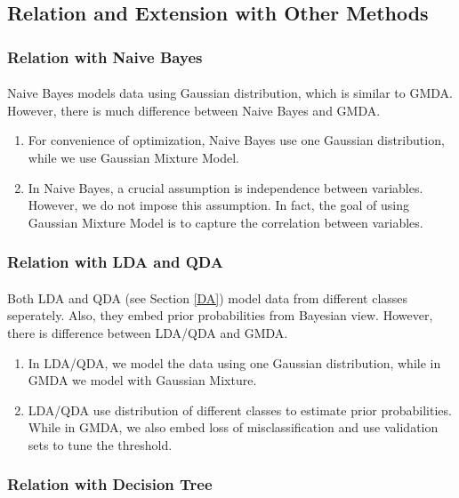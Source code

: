 \documentclass[english]{article}
\begin{document}
\subsection{Relation and Extension with Other Methods}

\subsubsection{Relation with Naive Bayes}
\paragraph{}

Naive Bayes models data using Gaussian distribution, which is similar to GMDA. However, there is much difference between Naive Bayes and GMDA.
\begin{enumerate}
\item For convenience of optimization, Naive Bayes use one Gaussian distribution, while we use Gaussian Mixture Model.
\item In Naive Bayes, a crucial assumption is independence between variables. However, we do not impose this assumption. In fact, the goal of using Gaussian Mixture Model is to capture the correlation between variables.
\end{enumerate}

\subsubsection{Relation with LDA and QDA}
\paragraph{}

Both LDA and QDA (see Section \ref{DA}) model data from different classes seperately. Also, they embed prior probabilities from Bayesian view. However, there is difference between LDA/QDA and GMDA.
\begin{enumerate}
\item In LDA/QDA, we model the data using one Gaussian distribution, while in GMDA we model with Gaussian Mixture.
\item LDA/QDA use distribution of different classes to estimate prior probabilities. While in GMDA, we also embed loss of misclassification and use validation sets to tune the threshold. 
\end{enumerate}

\subsubsection{Relation with Decision Tree}
\end{document}
